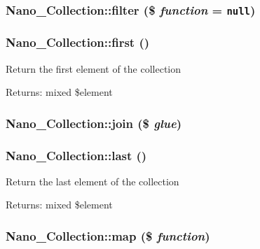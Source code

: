 \hypertarget{classNano__Collection_42a5cd30db833d7212dff48599e65e10}{
\subsubsection[{filter}]{\setlength{\rightskip}{0pt plus 5cm}Nano\_\-Collection::filter (\$ {\em function} = {\tt null})}}
\label{classNano__Collection_42a5cd30db833d7212dff48599e65e10}


\hypertarget{classNano__Collection_2ed528001470def798cfb38168e77b75}{
\subsubsection[{first}]{\setlength{\rightskip}{0pt plus 5cm}Nano\_\-Collection::first ()}}
\label{classNano__Collection_2ed528001470def798cfb38168e77b75}


Return the first element of the collection \begin{Desc}
\item[Returns:]mixed \$element \end{Desc}
\hypertarget{classNano__Collection_8c148b39d849f949ab1607b6a5635124}{
\subsubsection[{join}]{\setlength{\rightskip}{0pt plus 5cm}Nano\_\-Collection::join (\$ {\em glue})}}
\label{classNano__Collection_8c148b39d849f949ab1607b6a5635124}


\hypertarget{classNano__Collection_ddfd65eabf7563daf2f27be23d38cb07}{
\subsubsection[{last}]{\setlength{\rightskip}{0pt plus 5cm}Nano\_\-Collection::last ()}}
\label{classNano__Collection_ddfd65eabf7563daf2f27be23d38cb07}


Return the last element of the collection \begin{Desc}
\item[Returns:]mixed \$element \end{Desc}
\hypertarget{classNano__Collection_d0d19933a358135d5c2b4e9f02287776}{
\subsubsection[{map}]{\setlength{\rightskip}{0pt plus 5cm}Nano\_\-Collection::map (\$ {\em function})}}
\label{classNano__Collection_d0d19933a358135d5c2b4e9f02287776}


